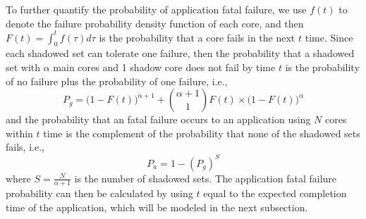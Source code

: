 To further quantify the probability of application fatal failure, we use 
$f(t)$ to denote the failure probability density function of each core, and then $F(t) = \int_0^tf(\tau)d\tau$ is the probability that a core fails in the next $t$ time. 
Since each shadowed set can tolerate one failure, 
then the probability that a shadowed set with $\alpha$ main cores and 1 shadow core does not fail by time $t$ is the probability of no failure plus the probability of one failure, i.e., 
\begin{equation}
	P_g = \Big(1-F(t)\Big)^{\alpha+1} + {{\alpha+1} \choose 1}F(t)\times \Big(1-F(t)\Big)^{\alpha}
\end{equation}
and the probability that an fatal failure occurs to an application using $N$ cores within $t$ time is the complement of the probability that
none of the shadowed sets fails, i.e.,
\begin{equation}
	P_a = 1 - ({P_g})^{S}
\end{equation}
where $S=\frac{N}{\alpha+1}$ is the number of shadowed sets.
The application fatal failure probability can then be calculated by using $t$ equal to the expected completion time of the application, which will be modeled in the next subsection.

